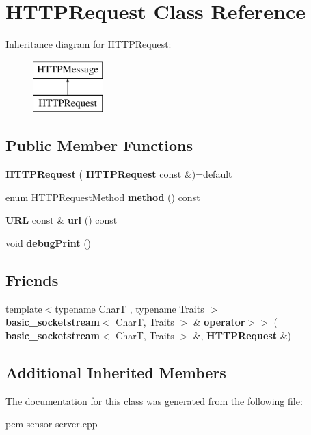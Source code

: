 \section{H\+T\+T\+P\+Request Class Reference}
\label{classHTTPRequest}
Inheritance diagram for H\+T\+T\+P\+Request\+:\begin{figure}[H]
\begin{center}
\leavevmode
\includegraphics[height=2.000000cm]{classHTTPRequest}
\end{center}
\end{figure}
\subsection*{Public Member Functions}
\begin{DoxyCompactItemize}
\item 
\mbox{\label{classHTTPRequest_aa8ceb153b7cead39b137e3374a5e8703}} 
{\bfseries H\+T\+T\+P\+Request} (\textbf{ H\+T\+T\+P\+Request} const \&)=default
\item 
\mbox{\label{classHTTPRequest_a94eab7daa3afce407369b51858644141}} 
enum H\+T\+T\+P\+Request\+Method {\bfseries method} () const
\item 
\mbox{\label{classHTTPRequest_aae5dbc6a8e64b7505be478f3cadc0a80}} 
\textbf{ U\+RL} const  \& {\bfseries url} () const
\item 
\mbox{\label{classHTTPRequest_ada2b926759b9dad82b773dc2cf93c6ee}} 
void {\bfseries debug\+Print} ()
\end{DoxyCompactItemize}
\subsection*{Friends}
\begin{DoxyCompactItemize}
\item 
\mbox{\label{classHTTPRequest_a7ab8d2e98e8db69b31adce51b0bad138}} 
{\footnotesize template$<$typename CharT , typename Traits $>$ }\\\textbf{ basic\+\_\+socketstream}$<$ CharT, Traits $>$ \& {\bfseries operator$>$$>$} (\textbf{ basic\+\_\+socketstream}$<$ CharT, Traits $>$ \&, \textbf{ H\+T\+T\+P\+Request} \&)
\end{DoxyCompactItemize}
\subsection*{Additional Inherited Members}


The documentation for this class was generated from the following file\+:\begin{DoxyCompactItemize}
\item 
pcm-\/sensor-\/server.\+cpp\end{DoxyCompactItemize}
